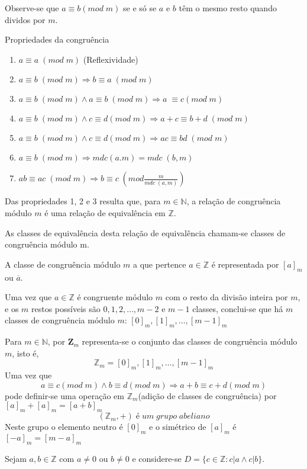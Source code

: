 Observe-se que $a \equiv b (mod\;m)$ se e só se $a$ e $b$ têm o mesmo resto quando dividos por $m$.

Propriedades da congruência

\begin{enumerate}
    \item $a \equiv a\;(mod\;m)$ (Reflexividade)
    \item $a \equiv b\;(mod\;m)\Rightarrow b\equiv a\;(mod\; m)$
    \item $a \equiv b\;(mod\;m) \land a \equiv b\;(mod\; m) \Rightarrow a\;\equiv c(mod\; m)$
    \item $a \equiv b\;(mod\;m) \land c \equiv d(mod\;m) \Rightarrow a + c \equiv b+d \;(mod\;m)$
    \item $a \equiv b\;(mod\; m) \land c \equiv d(mod\; m) \Rightarrow ac \equiv bd\;(mod\; m)$
    \item $a \equiv b\;(mod\; m)\Rightarrow mdc(a.m)=mdc\;(b,m)$
    \item $ab \equiv ac\;(mod\; m)\Rightarrow b \equiv c\;(mod \frac{m}{mdc\;(a,m)})$
\end{enumerate} 
Das propriedades 1, 2 e 3 resulta que, para $m \in \mathbb{N}$, a relação de congruência módulo $m$ é uma relação de equivalência em $\mathbb{Z}$.

As classes de equivalência desta relação de equivalência chamam-se classes de congruência módulo m.

A classe de congruência módulo $m$ a que pertence $a\in \mathbb{Z}$ é representada por $[a]_m$ ou $\overline{a}$.

Uma vez que $a \in \mathbb{Z}$ é congruente módulo $m$ com o resto da divisão inteira por $m$, e os $m$ restos possíveis são $0,1,2,\dotsc,m-2$ e $m-1$ classes, conclui-se que há $m$ classes de congruência módulo $m$:
$[0]_m,[1]_m,\dotsc,[m-1]_m$

Para $m \in \mathbb{N}$, por $\mathbf{Z}_m$ representa-se o conjunto das classes de congruência módulo $m$, isto é, $$\mathbb{Z}_m={[0]_m,[1]_m,\dotsc,[m-1]_m}$$
Uma vez que $$a \equiv c(mod\; m) \land b \equiv d(mod\; m) \Rightarrow a + b \equiv c + d(mod\; m)$$
pode definir-se uma operação em $\mathbb{Z}_m$(adição de classes de congruência) por $[a]_m + [a]_m =[a +b]_m$
$$(\mathbb{Z}_m,+) \; é \; um \; grupo \;abeliano$$
Neste grupo o elemento neutro é $[0]_m$ e o simétrico de $[a]_m$ é $[-a]_m=[m-a]_m$\\

\begin{definicao} Sejam $a,b \in \mathbb{Z}$ com $a \neq 0$ ou $b \neq 0$ e considere-se $D=\{c \in \mathbb{Z}: c|a \land c|b\}$.
\end{definicao}

